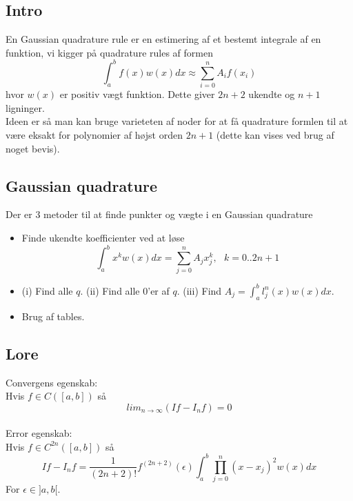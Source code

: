 \documentclass[11pt,a4paper]{article}
\begin{document}
\subsection*{Intro}
En Gaussian quadrature rule er en estimering af et bestemt integrale af en funktion, vi kigger på quadrature rules af formen 
$$
\int_a^b f(x)w(x)dx \approx \sum_{i=0}^n A_if(x_i)
$$
hvor $w(x)$ er positiv vægt funktion. Dette giver $2n+2$ ukendte og $n+1$ ligninger.\\
Ideen er så man kan bruge varieteten af noder for at få quadrature formlen til at være eksakt for polynomier af højst orden $2n+1$ (dette kan vises ved brug af noget bevis).



\subsection*{Gaussian quadrature}
Der er 3 metoder til at finde punkter og vægte i en Gaussian quadrature
\begin{itemize}
\item Finde ukendte koefficienter ved at løse
$$
\int_a^b x^kw(x)dx=\sum_{j=0}^n A_jx_j^k,\:\:\:k=0..2n+1
$$
\item (i) Find alle $q$. (ii) Find alle 0'er af $q$. (iii) Find $A_j=\int_a^bl_j^n(x)w(x)dx$.
\item Brug af tables.
\end{itemize}

\subsection*{Lore}
Convergens egenskab:\\
Hvis $f\in C([a,b])$ så
$$
lim_{n\rightarrow\infty}(If-I_nf)=0
$$
\\
Error egenskab:\\
Hvis $f\in C^{2n}([a,b])$ så
$$
If-I_nf=\frac{1}{(2n+2)!}f^{(2n+2)}(\epsilon)\int_a^b\prod_{j=0}^n (x-x_j)^2w(x)dx
$$
For $\epsilon\in ]a,b[$.
\end{document}
